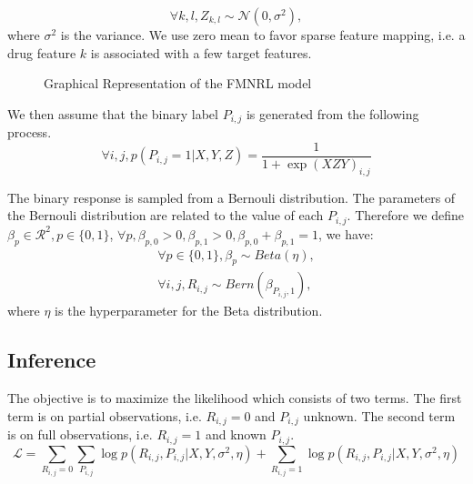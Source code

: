 \documentclass[sigconf,anonymous]{acmart}
\begin{document}
\begin{equation}\label{equ:z}
\forall k,l, Z_{k,l}\sim \mathcal{N}(0,\sigma^2),
\end{equation}
where $\sigma^2$ is the variance. We use zero mean to favor sparse feature mapping, i.e. a drug feature $k$ is associated with a few target features.

\begin{figure}\label{fig:model}
  \centering
\caption{Graphical Representation of the FMNRL model}
\end{figure}

We then assume that the binary label $P_{i,j}$ is generated from the following process.
\begin{equation}\label{equ:p}
\forall i,j, p(P_{i,j}=1|X,Y,Z)=\frac{1}{1+\exp{(XZY)}_{i,j}}
\end{equation}

The binary response is sampled from a Bernouli distribution. The parameters of the Bernouli distribution are related to the value of each $P_{i,j}$. Therefore we define $\beta_p\in\mathcal{R}^{2},p\in \{0,1\}$, $\forall p, \beta_{p,0}>0,\beta_{p,1}>0,\beta_{p,0}+\beta_{p,1}=1$, we have:
\begin{eqnarray}
\forall p\in \{0,1\}, \beta_p \sim Beta(\eta),\\
\forall i,j, R_{i,j} \sim Bern (\beta_{P_{i,j},1}),
\end{eqnarray}
where $\eta$ is the hyperparameter for the Beta distribution.

\subsection{Inference}\label{sec:inference}
The objective is to maximize the likelihood which consists of two terms. The first term is on partial observations, i.e. $R_{i,j}=0$ and $P_{i,j}$ unknown. The second term is on full observations, i.e. $R_{i,j}=1$ and known $P_{i,j}$.
\begin{equation}\label{equ:loss}
\mathcal{L}=\sum_{R_{i,j}=0}\sum_{P_{i,j}} \log p(R_{i,j},P_{i,j}|X,Y,\sigma^2,\eta) + \sum_{R_{i,j}=1} \log p(R_{i,j},P_{i,j}|X,Y,\sigma^2,\eta)
\end{equation}
\end{document}
